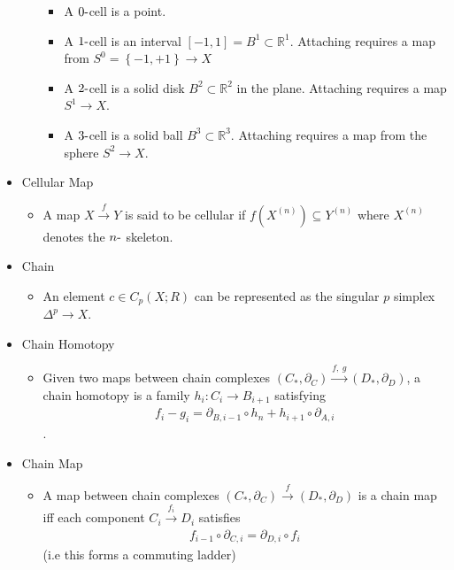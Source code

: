\begin{itemize}
\begin{itemize}
    \begin{itemize}
    \tightlist
    \item
      A \(0{\hbox{-}}\)cell is a point.
    \item
      A \(1{\hbox{-}}\)cell is an interval
      \([-1, 1] = B^1 \subset {\mathbb{R}}^1\). Attaching requires a map
      from \(S^0 =\left\{{-1, +1}\right\} \to X\)
    \item
      A \(2{\hbox{-}}\)cell is a solid disk
      \(B^2 \subset {\mathbb{R}}^2\) in the plane. Attaching requires a
      map \(S^1 \to X\).
    \item
      A \(3{\hbox{-}}\)cell is a solid ball
      \(B^3 \subset {\mathbb{R}}^3\). Attaching requires a map from the
      sphere \(S^2 \to X\).
    \end{itemize}
  \end{itemize}
\item
  Cellular Map

  \begin{itemize}
  \tightlist
  \item
    A map \(X \xrightarrow{f} Y\) is said to be cellular if
    \(f(X^{(n)}) \subseteq Y^{(n)}\) where \(X^{(n)}\) denotes the
    \(n{\hbox{-}}\) skeleton.
  \end{itemize}
\item
  Chain

  \begin{itemize}
  \tightlist
  \item
    An element \(c \in C_p(X; R)\) can be represented as the singular
    \(p\) simplex \(\Delta^p \to X\).
  \end{itemize}
\item
  Chain Homotopy

  \begin{itemize}
  \tightlist
  \item
    Given two maps between chain complexes
    \((C_*, {\partial}_C) \xrightarrow{f, ~g} (D_*, {\partial}_D)\), a
    chain homotopy is a family \(h_i: C_i \to B_{i+1}\) satisfying
    \begin{align*}f_i-g_i = {\partial}_{B, i-1}\circ h_n + h_{i+1}\circ {\partial}_{A, i}\end{align*}
    .
  \end{itemize}
\end{itemize}

\begin{itemize}
\tightlist
\item
  Chain Map

  \begin{itemize}
  \tightlist
  \item
    A map between chain complexes
    \((C_*, {\partial}_C) \xrightarrow{f} (D_*, {\partial}_D)\) is a
    chain map iff each component \(C_i \xrightarrow{f_i} D_i\) satisfies
    \begin{align*}
      f_{i-1}\circ{\partial}_{C, i} = {\partial}_{D,i} \circ f_i
      \end{align*}
    (i.e this forms a commuting ladder)
  \end{itemize}
\end{itemize}

